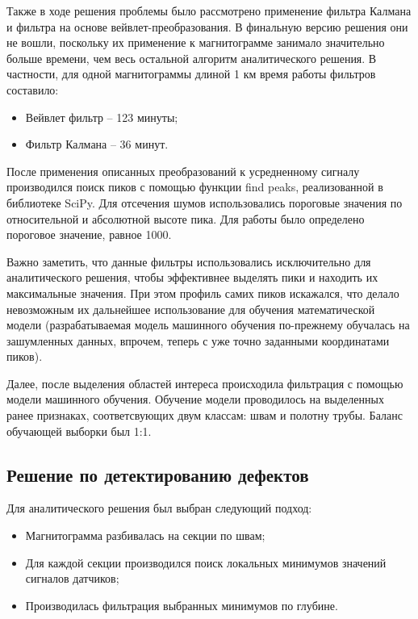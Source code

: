 \documentclass[a4paper,article,14pt]{extarticle}
\begin{document}
Также в ходе решения проблемы было рассмотрено применение фильтра Калмана и фильтра на основе вейвлет-преобразования. 
В финальную версию решения они не вошли, поскольку их применение к магнитограмме занимало значительно больше времени, 
чем весь остальной алгоритм аналитического решения. В частности, для одной магнитограммы длиной 1 км время работы 
фильтров составило:

\begin{itemize}
    \item Вейвлет фильтр – 123 минуты;
    \item Фильтр Калмана – 36 минут.
\end{itemize}

После применения описанных преобразований к усредненному сигналу производился поиск пиков с помощью функции 
find peaks, реализованной в библиотеке SciPy. Для отсечения шумов использовались пороговые значения 
по относительной и абсолютной высоте пика. Для работы было определено пороговое значение, равное 1000.

Важно заметить, что данные фильтры использовались исключительно для аналитического решения, чтобы эффективнее 
выделять пики и находить их максимальные значения. При этом профиль самих пиков искажался, что делало невозможным 
их дальнейшее использование для обучения математической модели (разрабатываемая модель машинного обучения по-прежнему 
обучалась на зашумленных данных, впрочем, теперь с уже точно заданными координатами пиков).

Далее, после выделения областей интереса происходила фильтрация с помощью модели машинного обучения. 
Обучение модели проводилось на выделенных ранее признаках, соответсвующих двум классам: швам и полотну трубы. 
Баланс обучающей выборки был 1:1. 

\subsection{Решение по детектированию дефектов}

Для аналитического решения был выбран следующий подход:

\begin{itemize}
    \item Магнитограмма разбивалась на секции по швам;
    \item Для каждой секции производился поиск локальных минимумов значений сигналов датчиков;
    \item Производилась фильтрация выбранных минимумов по глубине.
\end{itemize}
\end{document}
